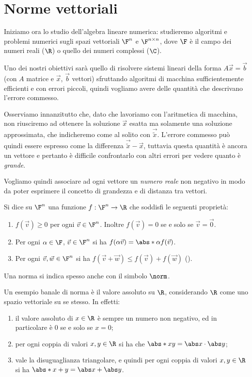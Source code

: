 \section{Norme vettoriali}

Iniziamo ora lo studio dell'algebra lineare numerica: studieremo algoritmi e problemi numerici sugli spazi vettoriali $\F^n$ e $\Mat{\F, n, n}$, dove $\F$ è il campo dei numeri reali ($\R$) o quello dei numeri complessi ($\C$). 

Uno dei nostri obiettivi sarà quello di risolvere sistemi lineari della forma $A\vec x = \vec b$ (con $A$ matrice e $\vec x$, $\vec b$ vettori) sfruttando algoritmi di macchina sufficientemente efficienti e con errori piccoli, quindi vogliamo avere delle quantità che descrivano l'errore commesso.

Osserviamo innanzitutto che, dato che lavoriamo con l'aritmetica di macchina, non riusciremo ad ottenere la soluzione $\vec x$ esatta ma solamente una soluzione approssimata, che indicheremo come al solito con $\vec{\tilde x}$. L'errore commesso può quindi essere espresso come la differenza $\vec{\tilde x} - \vec x$, tuttavia questa quantità è ancora un vettore e pertanto è difficile confrontarlo con altri errori per vedere quanto è \emph{grande}.

Vogliamo quindi associare ad ogni vettore un \emph{numero reale} non negativo in modo da poter esprimere il concetto di grandezza e di distanza tra vettori.

\begin{definition}
    Si dice  su $\F^n$ una funzione $f : \F^n \to \R$ che soddisfi le seguenti proprietà:
    \begin{enumerate}[(1)]
        \item $f(\vec v) \geq 0$ per ogni $\vec v \in \F^n$. Inoltre $f(\vec v) = 0$ se e solo se $\vec v = \vec 0$.
        \item Per ogni $\alpha \in \F$, $\vec v \in \F^n$ si ha $f(\alpha\vec v) = \abs*{\alpha}f(\vec v)$.
        \item Per ogni $\vec v, \vec w \in \F^n$ si ha $f(\vec v + \vec w) \leq f(\vec v) + f(\vec w)$ ().  
    \end{enumerate} 
    Una norma si indica spesso anche con il simbolo $\norm$. 
\end{definition}

Un esempio banale di norma è il valore assoluto su $\R$, considerando $\R$ come uno spazio vettoriale su se stesso. In effetti:
\begin{enumerate}[(1)]
    \item il valore assoluto di $x \in \R$ è sempre un numero non negativo, ed in particolare è $0$ se e solo se $x = 0$;
    \item per ogni coppia di valori $x, y \in \R$ si ha che $\abs*{xy} = \abs x\cdot\abs y$;
    \item vale la disuguaglianza triangolare, e quindi per ogni coppia di valori $x, y \in \R$ si ha $\abs*{x + y} = \abs x + \abs y$. 
\end{enumerate}

